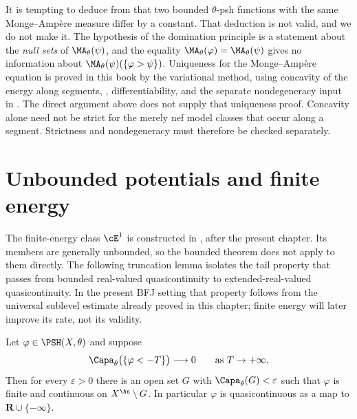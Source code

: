 \begin{remark}
\label{rem:ch25-no-uniqueness}
It is tempting to deduce from
 that two bounded $\theta$-psh
functions with the same Monge--Amp\`ere measure differ by a constant.  That
deduction is not valid, and we do not make it.  The hypothesis of the
domination principle is a statement about the \emph{null sets} of
$\MA_\theta(\psi)$, and the equality
$\MA_\theta(\varphi)=\MA_\theta(\psi)$ gives no information about
$\MA_\theta(\psi)(\{\varphi>\psi\})$.  Uniqueness for the
Monge--Amp\`ere equation is proved in this book by the variational
method, using concavity of the energy along segments,
, differentiability, and the separate
nondegeneracy input in .  The direct argument
above does not supply that uniqueness proof.  Concavity alone need not
be strict for the merely nef model classes that occur along a segment.
Strictness and nondegeneracy must therefore be checked separately.
\end{remark}

\section{Unbounded potentials and finite energy}
\label{sec:ch25-e1}

The finite-energy class $\cE^1$ is constructed in
, after the present chapter.  Its members are
generally unbounded, so the bounded theorem does not apply to them directly.
The following truncation lemma isolates the tail property that passes from
bounded real-valued quasicontinuity to extended-real-valued
quasicontinuity.  In the present BFJ setting that property follows from the
universal sublevel estimate already proved in this chapter; finite energy
will later improve its rate, not its validity.

\begin{lemma}
\label{lem:ch25-quasicontinuity-from-tail}
Let $\varphi\in\PSH(X,\theta)$ and suppose
\begin{equation}
\label{eq:ch25-tail-hypothesis}
 \Capa_\theta\bigl(\{\varphi<-T\}\bigr)\longrightarrow0
 \qquad\text{as }T\to+\infty .
\end{equation}
Then for every $\varepsilon>0$ there is an open set $G$ with
$\Capa_\theta(G)<\varepsilon$ such that $\varphi$ is finite and
continuous on $X^{\An}\setminus G$.  In particular $\varphi$ is
quasicontinuous as a map to $\mathbf R\cup\{-\infty\}$.
\end{lemma}

